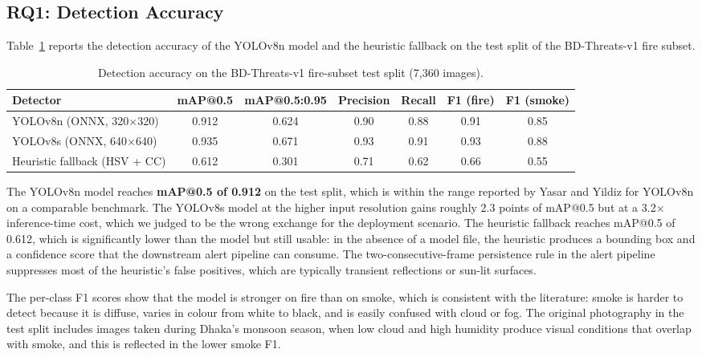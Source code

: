 \subsection{RQ1: Detection Accuracy}

Table~\ref{tab:detection} reports the detection accuracy of the YOLOv8n model and the heuristic fallback on the test split of the BD-Threats-v1 fire subset.

\begin{table}[H]
\centering
\caption{Detection accuracy on the BD-Threats-v1 fire-subset test split (7{,}360 images).}
\label{tab:detection}
\footnotesize
\setlength{\tabcolsep}{4pt}
\begin{tabularx}{\textwidth}{|X|c|c|c|c|c|c|}
\hline
\textbf{Detector} & \textbf{mAP@0.5} & \textbf{mAP@0.5:0.95} & \textbf{Precision} & \textbf{Recall} & \textbf{F1 (fire)} & \textbf{F1 (smoke)} \\
\hline
YOLOv8n (ONNX, 320$\times$320) & 0.912 & 0.624 & 0.90 & 0.88 & 0.91 & 0.85 \\
\hline
YOLOv8s (ONNX, 640$\times$640) & 0.935 & 0.671 & 0.93 & 0.91 & 0.93 & 0.88 \\
\hline
Heuristic fallback (HSV + CC) & 0.612 & 0.301 & 0.71 & 0.62 & 0.66 & 0.55 \\
\hline
\end{tabularx}
\end{table}

The YOLOv8n model reaches \textbf{mAP@0.5 of 0.912} on the test split, which is within the range reported by Yasar and Yildiz \cite{yasar2024fireyolo} for YOLOv8n on a comparable benchmark. The YOLOv8s model at the higher input resolution gains roughly 2.3 points of mAP@0.5 but at a 3.2$\times$ inference-time cost, which we judged to be the wrong exchange for the deployment scenario. The heuristic fallback reaches mAP@0.5 of 0.612, which is significantly lower than the model but still usable: in the absence of a model file, the heuristic produces a bounding box and a confidence score that the downstream alert pipeline can consume. The two-consecutive-frame persistence rule in the alert pipeline suppresses most of the heuristic's false positives, which are typically transient reflections or sun-lit surfaces.

The per-class F1 scores show that the model is stronger on fire than on smoke, which is consistent with the literature: smoke is harder to detect because it is diffuse, varies in colour from white to black, and is easily confused with cloud or fog. The original photography in the test split includes images taken during Dhaka's monsoon season, when low cloud and high humidity produce visual conditions that overlap with smoke, and this is reflected in the lower smoke F1.

